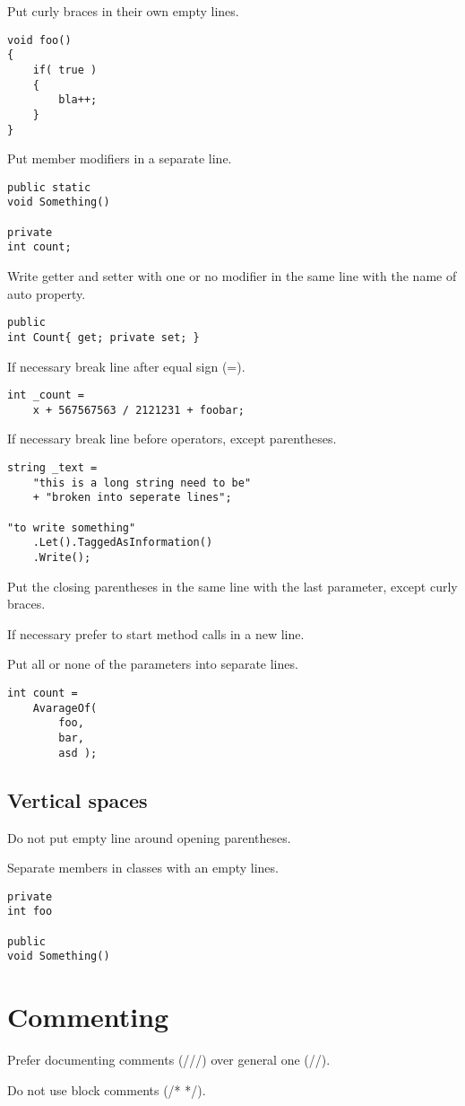 \documentclass[11pt,a4paper]{book}
\begin{document}
\domark Put curly braces in their own empty lines.
\begin{verbatim}
void foo()
{
    if( true )
    {
        bla++;
    }
}
\end{verbatim}

\domark Put member modifiers in a separate line.
\begin{verbatim}
public static
void Something()

private
int count;
\end{verbatim}

\domark Write getter and setter with one or no modifier in the same line with the name of auto property.
\begin{verbatim}
public
int Count{ get; private set; }
\end{verbatim}

\domark If necessary break line after equal sign (=).
\begin{verbatim}
int _count =
    x + 567567563 / 2121231 + foobar;
\end{verbatim}

\domark If necessary break line before operators, except parentheses.
\begin{verbatim}
string _text =
    "this is a long string need to be"
    + "broken into seperate lines";

"to write something"
    .Let().TaggedAsInformation()
    .Write();
\end{verbatim}

\domark Put the closing parentheses in the same line with the last parameter, except curly braces.

\domark If necessary prefer to start method calls in a new line.

\domark Put all or none of the parameters into separate lines.
\begin{verbatim}
int count =
    AvarageOf(
        foo,
        bar,
        asd );
\end{verbatim}

\subsection{Vertical spaces}

\notmark Do not put empty line around opening parentheses.

\domark Separate members in classes with an empty lines.
\begin{verbatim}
private
int foo

public
void Something()
\end{verbatim}

\section{Commenting}

\domark Prefer documenting comments (///) over general one (//).

\notmark Do not use block comments (/* */).
\end{document}
